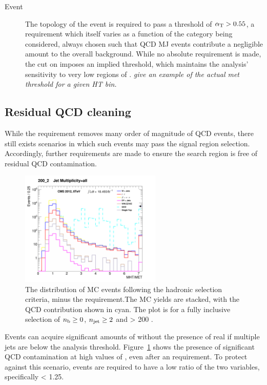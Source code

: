 \begin{description}
\item[Event]
The topology of the event is required to pass a threshold of $\alpha_{\text{T}} > 0.55$, 
a requirement which itself varies as a function of the \HT category being
considered, always
chosen such that QCD MJ events contribute a negligible amount to the overall 
background. While no absolute \met requirement is made, the cut on 
\alphat imposes an implied threshold, which maintains the analysis'
sensitivity to very low regions of \met. \emph{give an example of the actual met
threshold for a given HT bin.}

\end{description}

\subsection{Residual QCD cleaning}

While the \alphat requirement removes many order of magnitude of QCD events,
there still exists scenarios in which such events may pass the signal region
selection. Accordingly, further requirements are made to ensure the search
region is free of residual QCD contamination.

\begin{figure}[ht!]
\centering
\includegraphics[width=0.6\textwidth]
{Figs/datamc/had/v1/Stacked_MHTovMET_all_200_upwards.png}
\caption{The \mhtmet distribution of MC events following the hadronic selection
criteria, minus the \mhtmet requirement.The MC yields are stacked,
with the QCD contribution shown in cyan. The plot is for a fully inclusive
selection of $n_{\text{b}} \geq 0$, $n_{\text{jet}} \geq 2$ and \HT > 200 \gev.}
\label{fig:full_mhtmet_distro}
\end{figure}

Events can acquire significant amounts of \mht without the presence of
real \met if multiple jets are below the analysis threshold.
Figure~\ref{fig:full_mhtmet_distro} shows the presence of significant QCD contamination
at high values of \mhtmet, even after an \alphat requirement. To protect against
this scenario, events are required to have a low ratio of the two variables,
specifically \mhtmet < 1.25.

